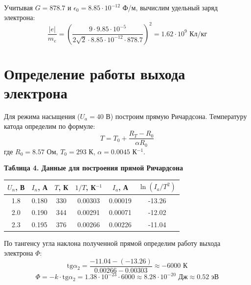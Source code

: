 \documentclass[a4paper,14pt]{extarticle}
\begin{document}
Учитывая $G = 878.7$ и $\epsilon_0 = 8.85 \cdot 10^{-12}$ Ф/м, вычислим удельный заряд электрона:
\[
\frac{|e|}{m_e} = \left( \frac{9 \cdot 9.85 \cdot 10^{-5}}{2\sqrt{2} \cdot 8.85 \cdot 10^{-12} \cdot 878.7} \right)^2 = 1.62 \cdot 10^9 \text{ Кл/кг}
\]


\section*{Определение работы выхода электрона}

Для режима насыщения ($U_a = 40$ В) построим прямую Ричардсона. Температуру катода определим по формуле:
\[ T = T_0 + \frac{R_T - R_0}{\alpha R_0} \]
где $R_0 = 8.57$ Ом, $T_0 = 293$ К, $\alpha = 0.0045$ К$^{-1}$.

\textbf{Таблица 4. Данные для построения прямой Ричардсона}
\begin{center}
\begin{tabular}{|c|c|c|c|c|c|}
\hline
$U_n$, В & $I_n$, А & $T$, К & $1/T$, К$^{-1}$ & $I_a$, А & $\ln(I_a/T^2)$ \\
\hline
1.8 & 0.180 & 330 & 0.00303 & 0.00019 & -13.26 \\
2.0 & 0.190 & 344 & 0.00291 & 0.00071 & -12.02 \\
2.3 & 0.195 & 376 & 0.00266 & 0.00226 & -11.04 \\
\hline
\end{tabular}
\end{center}

\begin{center}
\end{center}

По тангенсу угла наклона полученной прямой определим работу выхода электрона $\Phi$:
\[ \text{tg}\alpha_2 = \frac{-11.04 - (-13.26)}{0.00266 - 0.00303} \approx -6000 \text{ К} \]
\[ \Phi = -k \cdot \text{tg}\alpha_2 = 1.38 \cdot 10^{-23} \cdot 6000 \approx 8.28 \cdot 10^{-20} \text{ Дж} \approx 0.52 \text{ эВ} \]
\end{document}
